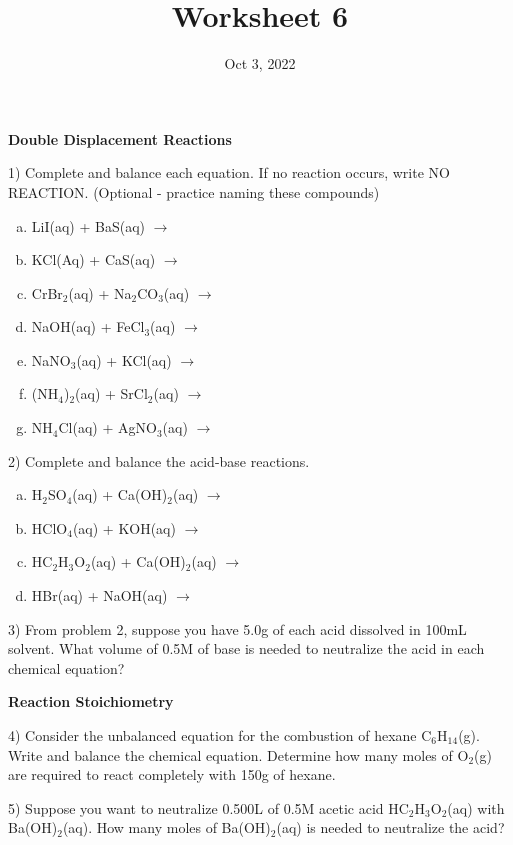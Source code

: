 \documentclass[12pt]{article}
\title{\textbf{Worksheet 6}}
\date{Oct 3, 2022}
\begin{document}
\maketitle 

\textbf{Double Displacement Reactions}

1) Complete and balance each equation. If no reaction occurs,
write NO REACTION. (Optional - practice naming these compounds)

\begin{enumerate}[(a)]
\item LiI(aq) + BaS(aq) $\rightarrow$
\item KCl(Aq) + CaS(aq) $\rightarrow$
\item CrBr$_2$(aq) + Na$_2$CO$_3$(aq) $\rightarrow$
\item NaOH(aq) + FeCl$_3$(aq) $\rightarrow$
\item NaNO$_3$(aq) + KCl(aq) $\rightarrow$
\item (NH$_4$)$_2$(aq) + SrCl$_2$(aq) $\rightarrow$
\item NH$_4$Cl(aq) + AgNO$_3$(aq) $\rightarrow$
\end{enumerate}

2) Complete and balance the acid-base reactions.

\begin{enumerate}[(a)]
\item H$_2$SO$_4$(aq) + Ca(OH)$_2$(aq) $\rightarrow$
\item HClO$_4$(aq) + KOH(aq) $\rightarrow$
\item HC$_2$H$_3$O$_2$(aq) + Ca(OH)$_2$(aq) $\rightarrow$
\item HBr(aq) + NaOH(aq) $\rightarrow$
\end{enumerate}

3) From problem 2, suppose you have 5.0g of each acid dissolved
in 100mL solvent. What volume of 0.5M of base is needed to neutralize
the acid in each chemical equation?

\newpage

\textbf{Reaction Stoichiometry}

4) Consider the unbalanced equation for the combustion of hexane
C$_6$H$_{14}$(g). Write and balance the chemical equation. Determine
how many moles of O$_2$(g) are required to react completely with
150g of hexane.

5) Suppose you want to neutralize 0.500L of 0.5M acetic
acid HC$_2$H$_3$O$_2$(aq) with Ba(OH)$_2$(aq). How many moles of
Ba(OH)$_2$(aq) is needed to neutralize the acid?
\end{document}
